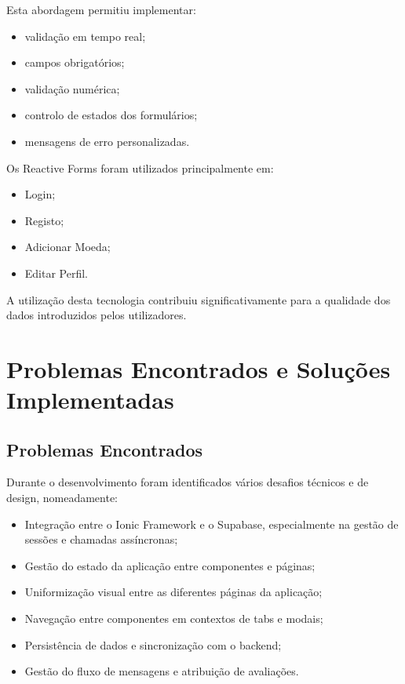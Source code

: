 \documentclass[12pt,a4paper]{article}
\begin{document}
Esta abordagem permitiu implementar:

\begin{itemize}
\setlength{\itemsep}{0.15em}
\item validação em tempo real;
\item campos obrigatórios;
\item validação numérica;
\item controlo de estados dos formulários;
\item mensagens de erro personalizadas.
\end{itemize}

Os Reactive Forms foram utilizados principalmente em:

\begin{itemize}
\setlength{\itemsep}{0.15em}
\item Login;
\item Registo;
\item Adicionar Moeda;
\item Editar Perfil.
\end{itemize}

A utilização desta tecnologia contribuiu significativamente para a qualidade dos dados introduzidos pelos utilizadores.

\section{Problemas Encontrados e Soluções Implementadas}

\subsection{Problemas Encontrados}

Durante o desenvolvimento foram identificados vários desafios técnicos e de design, nomeadamente:

\begin{itemize}
\setlength{\itemsep}{0.15em}
\item Integração entre o Ionic Framework e o Supabase, especialmente na gestão de sessões e chamadas assíncronas;
\item Gestão do estado da aplicação entre componentes e páginas;
\item Uniformização visual entre as diferentes páginas da aplicação;
\item Navegação entre componentes em contextos de tabs e modais;
\item Persistência de dados e sincronização com o backend;
\item Gestão do fluxo de mensagens e atribuição de avaliações.
\end{itemize}
\end{document}
